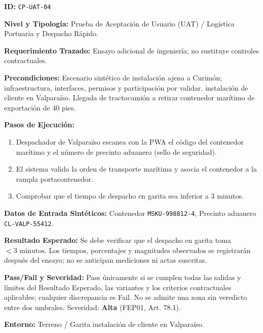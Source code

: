 \par\noindent\textbf{ID:} \texttt{C\allowbreak{}P\allowbreak{}-\allowbreak{}U\allowbreak{}A\allowbreak{}T\allowbreak{}-\allowbreak{}0\allowbreak{}4\allowbreak{}}\par
\par\noindent\textbf{Nivel y Tipología:} Prueba de Aceptación de Usuario (UAT) / Logística Portuaria y Despacho Rápido.\par
\par\noindent\textbf{Requerimiento Trazado:} Ensayo adicional de ingeniería; no sustituye controles contractuales.\par
\par\noindent\textbf{Precondiciones:} Escenario sintético de instalación ajena a Curimón; infraestructura, interfaces, permisos y participación por validar.  instalación de cliente en Valparaíso. Llegada de tractocamión a retirar contenedor marítimo de exportación de 40 pies.\par
\par\noindent\textbf{Pasos de Ejecución:} \par
\begin{enumerate}
\item Despachador de Valparaíso escanea con la PWA el código del contenedor marítimo y el número de precinto aduanero (sello de seguridad).
\item El sistema valida la orden de transporte marítima y asocia el contenedor a la rampla portacontenedor.
\item Comprobar que el tiempo de despacho en garita sea inferior a 3 minutos.
\end{enumerate}
\par\noindent\textbf{Datos de Entrada Sintéticos:} Contenedor \texttt{M\allowbreak{}S\allowbreak{}K\allowbreak{}U\allowbreak{}-\allowbreak{}9\allowbreak{}9\allowbreak{}8\allowbreak{}8\allowbreak{}1\allowbreak{}2\allowbreak{}-\allowbreak{}4\allowbreak{}}, Precinto aduanero \texttt{C\allowbreak{}L\allowbreak{}-\allowbreak{}V\allowbreak{}A\allowbreak{}L\allowbreak{}P\allowbreak{}-\allowbreak{}5\allowbreak{}5\allowbreak{}4\allowbreak{}1\allowbreak{}2\allowbreak{}}.\par
\par\noindent\textbf{Resultado Esperado:} Se debe verificar que el despacho en garita toma \(< 3\text{ minutos}\). Los tiempos, porcentajes y magnitudes observados se registrarán después del ensayo; no se anticipan mediciones ni actas suscritas.\par
\par\noindent\textbf{Pass/Fail y Severidad:} Pass únicamente si se cumplen todas las salidas y límites del Resultado Esperado, las variantes y los criterios contractuales aplicables; cualquier discrepancia es Fail. No se admite una zona sin veredicto entre dos umbrales. Severidad: \textbf{Alta} (FEP01, Art. 78.1).\par
\par\noindent\textbf{Entorno:} Terreno / Garita instalación de cliente en Valparaíso.\par







